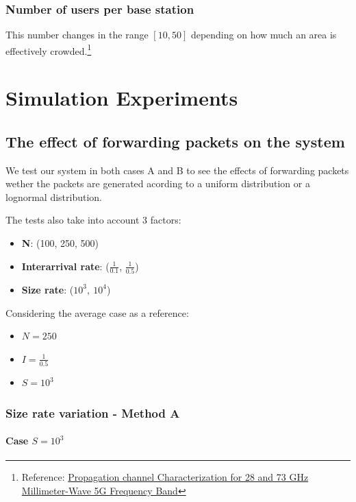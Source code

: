 \documentclass{report}
\begin{document}
\subsection{Number of users per base station}
This number changes in the range $[10, 50]$ depending on how much an area is effectively crowded.\footnote{Reference: \href{https://ieeexplore.ieee.org/document/8305375}{Propagation channel Characterization for 28 and 73 GHz Millimeter-Wave 5G Frequency Band}}

\chapter{Simulation Experiments}
\section{The effect of forwarding packets on the system}
We test our system in both cases A and B to see the effects of forwarding packets wether the packets are generated acording to a uniform distribution or a lognormal distribution.

The tests also take into account 3 factors:
\begin{itemize}
    \item \textbf{N}: (100, 250, 500)
    \item \textbf{Interarrival rate}: ($\frac{1}{0.1}$, $\frac{1}{0.5}$)
    \item \textbf{Size rate}: ($10^3,\ 10^4$)
\end{itemize}

Considering the average case as a reference:
\begin{itemize}
    \item $N=250$
    \item $I=\frac{1}{0.5}$
    \item $S=10^3$
\end{itemize}

\subsection{Size rate variation - Method A}
\subsubsection*{Case $S=10^3$}
\end{document}

